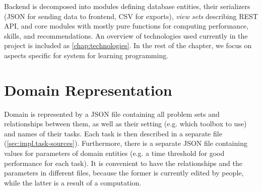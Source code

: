 
Backend is decomposed into modules defining database entities,
their serializers (JSON for sending data to frontend, CSV for exports),
\emph{view sets} describing REST API, %
and core modules with mostly pure functions
for computing performance, skills, and recommendations.
An overview of technologies used currently in the project
is included as \cref{chap:technologies}.
In the rest of the chapter, we focus on aspects specific for
system for learning programming.

\section{Domain Representation}

Domain is represented by a JSON file containing all problem sets %
and relationships between them, as well as their setting (e.g. which toolbox to use)
and names of their tasks.
Each task is then described in a separate file (\cref{sec:impl.task-sources}).
Furthermore, there is a separate JSON file containing values for parameters
of domain entities (e.g. a time threshold for good performance for each task).
It is convenient to have the relationships and the parameters in different files,
because the former is currently edited by people, while the latter is
a result of a computation.

